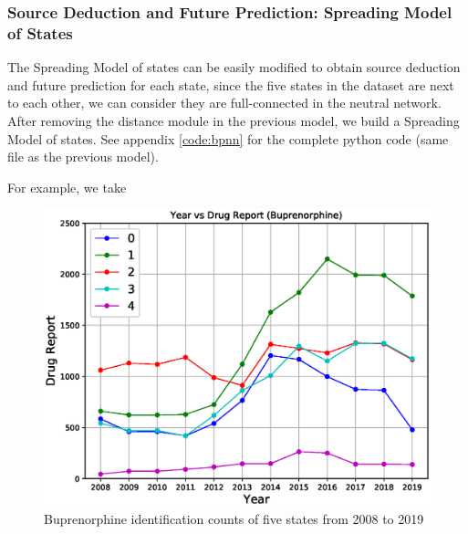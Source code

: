 \documentclass{mcmthesis}
\begin{document}
\subsubsection{Source Deduction and Future Prediction: Spreading Model of States}

The Spreading Model of states can be easily modified to obtain source deduction and future prediction for each state, since the five states in the dataset are next to each other, we can consider they are full-connected in the neutral network. After removing the distance module in the previous model, we build a Spreading Model of states. See appendix \ref{code:bpnn} for the complete python code (same file as the previous model). 

For example, we take 

\begin{figure}
    \centering
    \includegraphics[width=\textwidth]{../figure/state_Buprenorphine} 
    \caption{Buprenorphine identification counts of five states from 2008 to 2019}
    \label{fig:state_Buprenorphine}
\end{figure}
\end{document}

